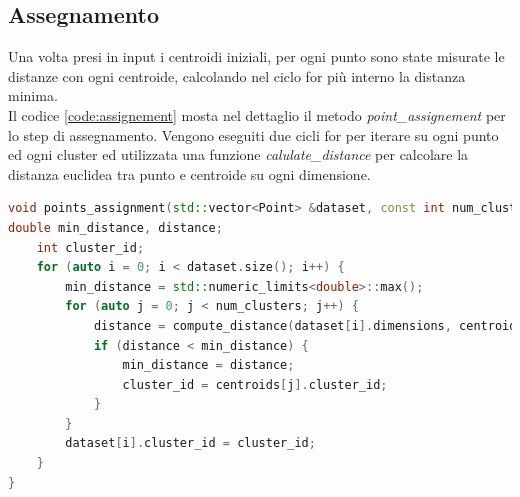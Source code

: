 \documentclass[10pt,twocolumn,letterpaper]{article}
\begin{document}
\subsection{Assegnamento}
Una volta presi in input i centroidi iniziali, per ogni punto sono state misurate le distanze con ogni centroide, calcolando nel ciclo for più interno la distanza minima.\\
Il codice \ref{code:assignement} mosta nel dettaglio il metodo \textit{point\_assignement} per lo step di assegnamento. Vengono eseguiti due cicli for per iterare su ogni punto ed ogni cluster ed utilizzata una funzione \textit{calulate\_distance} per calcolare la distanza euclidea tra punto e centroide su ogni dimensione.

\begin{lstlisting}[language=c++, caption=Assegnamento sequenziale, label=code:assignement]
void points_assignment(std::vector<Point> &dataset, const int num_clusters, const std::vector<Point> &centroids) {
double min_distance, distance;
	int cluster_id;
	for (auto i = 0; i < dataset.size(); i++) {
		min_distance = std::numeric_limits<double>::max();
		for (auto j = 0; j < num_clusters; j++) {
			distance = compute_distance(dataset[i].dimensions, centroids[j].dimensions);
			if (distance < min_distance) {
				min_distance = distance;
				cluster_id = centroids[j].cluster_id;
			}
		}
		dataset[i].cluster_id = cluster_id;
	}
}
\end{lstlisting}
\end{document}
